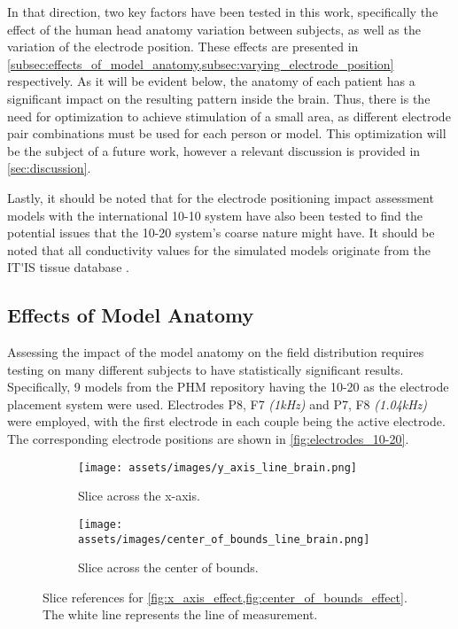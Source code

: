 In that direction, two key factors have been tested in this work, specifically the effect of the human head anatomy variation between subjects, as well as the variation of the electrode position. These effects are presented in \cref{subsec:effects_of_model_anatomy,subsec:varying_electrode_position} respectively. As it will be evident below, the anatomy of each patient has a significant impact on the resulting pattern inside the brain. Thus, there is the need for optimization to achieve stimulation of a small area, as different electrode pair combinations must be used for each person or model. This optimization will be the subject of a future work, however a relevant discussion is provided in \autoref{sec:discussion}.

Lastly, it should be noted that for the electrode positioning impact assessment models with the international 10-10 system have also been tested to find the potential issues that the 10-20 system's coarse nature might have. It should be noted that all conductivity values for the simulated models originate from the \gls{IT'IS} tissue database \cite{ITstissue}.

\subsection{Effects of Model Anatomy}
\label{subsec:effects_of_model_anatomy}

Assessing the impact of the model anatomy on the field distribution requires testing on many different subjects to have statistically significant results. Specifically, 9 models from the \gls{PHM} repository \cite{ErikG.Lee2016} having the 10-20 as the electrode placement system were used. Electrodes P8, F7 \textit{(1\si{kHz})} and P7, F8 \textit{(1.04\si{kHz})} were employed, with the first electrode in each couple being the active electrode. The corresponding electrode positions are shown in \autoref{fig:electrodes_10-20}.

\begin{figure}[H]
    \centering
    \begin{subfigure}[b]{0.49\textwidth}
        \texttt{[image: assets/images/y\_axis\_line\_brain.png]}
        \caption{Slice across the x-axis.}
        \label{fig:brain_slice_for_effects_x}
    \end{subfigure}
    \begin{subfigure}[b]{0.49\textwidth}
        \texttt{[image: assets/images/center\_of\_bounds\_line\_brain.png]}
        \caption{Slice across the center of bounds.}
        \label{fig:brain_slice_for_effects_cf}
    \end{subfigure}
    \caption{Slice references for \cref{fig:x_axis_effect,fig:center_of_bounds_effect}. The white line represents the line of measurement.}
    \label{fig:brain_slice_for_effects}
\end{figure}

